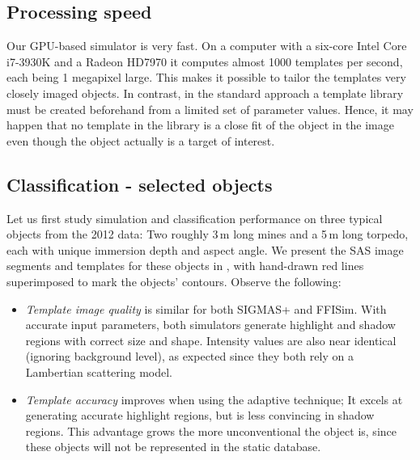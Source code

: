 \subsection{Processing speed}

%


Our GPU-based simulator is very fast. On a computer with a six-core Intel Core i7-3930K and a Radeon HD7970 it computes almost 1000 templates per second, each being 1 megapixel large. This makes it possible to tailor the templates very closely imaged objects. In contrast, in the standard approach a template library must be created beforehand from a limited set of parameter values. Hence, it may happen that no template in the library is a close fit of the object in the image even though the object actually is a target of interest.



\subsection{Classification - selected objects}


Let us first study simulation and classification performance on three typical objects from the 2012 data: Two roughly 3\,m long mines and a 5\,m long torpedo, each with unique immersion depth and aspect angle. We present the SAS image segments and templates for these objects in , with hand-drawn red lines superimposed to mark the objects' contours. Observe the following:
%
\begin{itemize}
\item \emph{Template image quality} is similar for both SIGMAS+ and FFISim. With accurate input parameters, both simulators generate highlight and shadow regions with correct size and shape. Intensity values are also near identical (ignoring background level), as expected since they both rely on a Lambertian scattering model.
\item \emph{Template accuracy} improves when using the adaptive technique; It excels at generating accurate highlight regions, but is less convincing in shadow regions. This advantage grows the more unconventional the object is, since these objects will not be represented in the static database.
\end{itemize}

